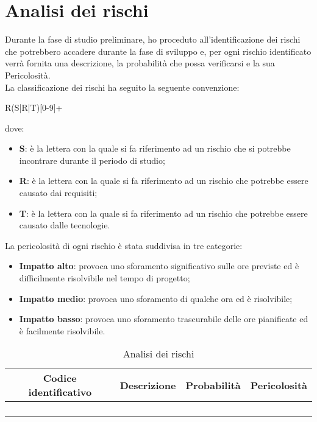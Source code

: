 
\section{Analisi dei rischi}
Durante la fase di studio preliminare, ho proceduto all'identificazione dei rischi che potrebbero accadere durante la fase di sviluppo e, per ogni rischio identificato verrà fornita una descrizione, la probabilità che possa verificarsi e la sua Pericolosità. \\

La classificazione dei rischi ha seguito la seguente convenzione:
\begin{center}
  R(S|R|T)[0-9]+
\end{center}
dove:
\begin{itemize}
  \item \textbf{S}: è la lettera con la quale si fa riferimento ad un rischio che si potrebbe incontrare durante il periodo di studio;
  \item \textbf{R}: è la lettera con la quale si fa riferimento ad un rischio che potrebbe essere causato dai requisiti;
  \item \textbf{T}: è la lettera con la quale si fa riferimento ad un rischio che potrebbe essere causato dalle tecnologie.
\end{itemize}

La pericolosità di ogni rischio è stata suddivisa in tre categorie:
\begin{itemize}
  \item \textbf{Impatto alto}: provoca uno sforamento significativo sulle ore previste ed è difficilmente risolvibile nel tempo di progetto;
  \item \textbf{Impatto medio}: provoca uno sforamento di qualche ora ed è risolvibile;
  \item \textbf{Impatto basso}: provoca uno sforamento trascurabile delle ore pianificate ed è facilmente risolvibile.
\end{itemize}

\begin{longtabu}{|c|X[2,l]|c|c|}

  \hline

  \textbf{Codice identificativo} & \textbf{Descrizione} & \textbf{Probabilità} & \textbf{Pericolosità} \\

  \hline

   & & &  \\

  \hline

   & & &  \\

  \hline

   & & &  \\

  \hline

  \caption{Analisi dei rischi}
\end{longtabu}
